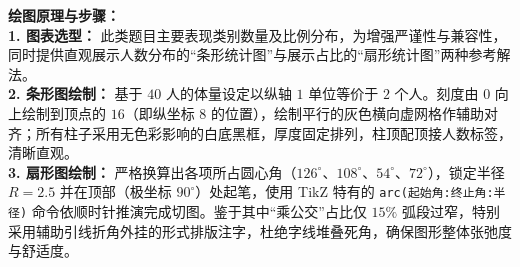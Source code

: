 \vspace{0.4cm}
{\small\color{blue!70!black}
\textbf{绘图原理与步骤：}\\
\textbf{1. 图表选型：} 此类题目主要表现类别数量及比例分布，为增强严谨性与兼容性，同时提供直观展示人数分布的“条形统计图”与展示占比的“扇形统计图”两种参考解法。\\
\textbf{2. 条形图绘制：} 基于 $40$ 人的体量设定以纵轴 $1$ 单位等价于 $2$ 个人。刻度由 $0$ 向上绘制到顶点的 $16$（即纵坐标 $8$ 的位置），绘制平行的灰色横向虚网格作辅助对齐；所有柱子采用无色彩影响的白底黑框，厚度固定排列，柱顶配顶接人数标签，清晰直观。\\
\textbf{3. 扇形图绘制：} 严格换算出各项所占圆心角（$126^\circ$、$108^\circ$、$54^\circ$、$72^\circ$），锁定半径 $R=2.5$ 并在顶部（极坐标 $90^\circ$）处起笔，使用 TikZ 特有的 \texttt{arc(起始角:终止角:半径)} 命令依顺时针推演完成切图。鉴于其中“乘公交”占比仅 $15\%$ 弧段过窄，特别采用辅助引线折角外挂的形式排版注字，杜绝字线堆叠死角，确保图形整体张弛度与舒适度。
}

\newpage


